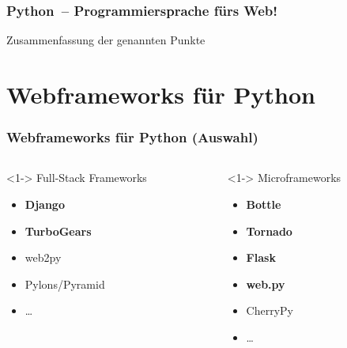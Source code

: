 \documentclass[
    t,
    smaller,
    compress,
    xcolor=svgnames,            %
    table,
]{beamer}
\begin{document}
\begin{frame}
  \frametitle{Python~-- Programmiersprache fürs Web!}

  Zusammenfassung der genannten Punkte


\end{frame}


\section{Webframeworks für Python}
\begin{frame}
  \frametitle{Webframeworks für Python (Auswahl)}

  \begin{columns}[T]
    \begin{column}[T]{.5\textwidth}<1->
        Full-Stack Frameworks
        \vspace{4pt}
        \begin{itemize}[<1->]
            \item \textbf{Django}
            \item \textbf{TurboGears}
            \item web2py
            \item Pylons/Pyramid
            \item \dots
        \end{itemize}
    \end{column}
    \begin{column}[T]{.5\textwidth}<1->
        Microframeworks
        \begin{itemize}[<1->]
            \item \textbf{Bottle}
            \item \textbf{Tornado}
            \item \textbf{Flask}
            \item \textbf{web.py}
            \item CherryPy
            \item \dots
        \end{itemize}
    \end{column}
  \end{columns}

\end{frame}
\end{document}
